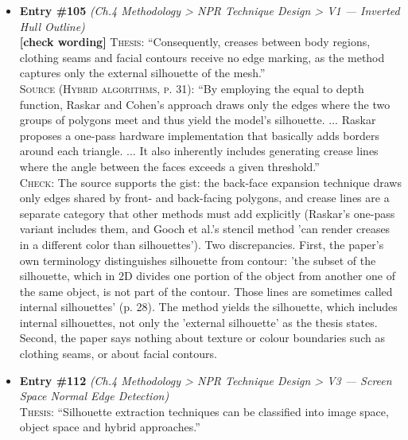 \documentclass[11pt, a4paper]{article}
\begin{document}
\begin{itemize}[leftmargin=1.2em,itemsep=4pt]
\textsc{Check:} The paper states hybrid algorithms run at interactive to real-time frame rates, and Table 1 explicitly recommends against preprocessing-based silhouette detection when the model is animated in real time, since 'this precomputed data structure would become invalid and result in new precomputation steps for every frame' (Precomputation methods, p. 34). The avatar application is the thesis's own framing and is not discussed in the source.
\item \textbf{Entry \#105} \textit{(Ch.4 Methodology > NPR Technique Design > V1 — Inverted Hull Outline)}\\
\textcolor{partialorange}{\textbf{[check wording]}} \textsc{Thesis:} ``Consequently, creases between body regions, clothing seams and facial contours receive no edge marking, as the method captures only the external silhouette of the mesh.''\\
\textsc{Source (Hybrid algorithms, p. 31):} ``By employing the equal to depth function, Raskar and Cohen's approach draws only the edges where the two groups of polygons meet and thus yield the model's silhouette. ... Raskar proposes a one-pass hardware implementation that basically adds borders around each triangle. ... It also inherently includes generating crease lines where the angle between the faces exceeds a given threshold.''\\
\textsc{Check:} The source supports the gist: the back-face expansion technique draws only edges shared by front- and back-facing polygons, and crease lines are a separate category that other methods must add explicitly (Raskar's one-pass variant includes them, and Gooch et al.'s stencil method 'can render creases in a different color than silhouettes'). Two discrepancies. First, the paper's own terminology distinguishes silhouette from contour: 'the subset of the silhouette, which in 2D divides one portion of the object from another one of the same object, is not part of the contour. Those lines are sometimes called internal silhouettes' (p. 28). The method yields the silhouette, which includes internal silhouettes, not only the 'external silhouette' as the thesis states. Second, the paper says nothing about texture or colour boundaries such as clothing seams, or about facial contours.
\item \textbf{Entry \#112} \textit{(Ch.4 Methodology > NPR Technique Design > V3 — Screen Space Normal Edge Detection)}\\
\textsc{Thesis:} ``Silhouette extraction techniques can be classified into image space, object space and hybrid approaches.''\\

\end{itemize}
\end{document}
